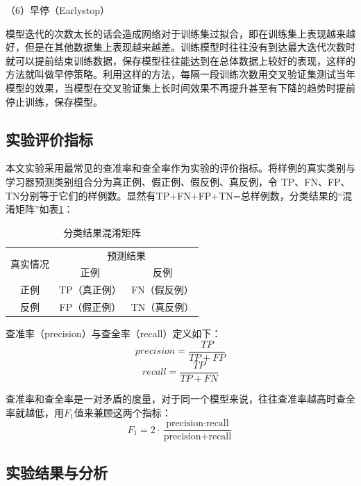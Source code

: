 \documentclass[winfonts,master,oneside,nobackinfo]{njuthesis}
\begin{document}
（6）早停（Earlystop）

模型迭代的次数太长的话会造成网络对于训练集过拟合，即在训练集上表现越来越好，但是在其他数据集上表现越来越差。训练模型时往往没有到达最大迭代次数时就可以提前结束训练数据，保存模型往往能达到在总体数据上较好的表现，这样的方法就叫做早停策略。利用这样的方法，每隔一段训练次数用交叉验证集测试当年模型的效果，当模型在交叉验证集上长时间效果不再提升甚至有下降的趋势时提前停止训练，保存模型。

\subsection{实验评价指标}

本文实验采用最常见的查准率和查全率作为实验的评价指标。将样例的真实类别与学习器预测类别组合分为真正例、假正例、假反例、真反例，令
TP、FN、FP、TN分别等于它们的样例数。显然有TP+FN+FP+TN=总样例数，分类结果的“混淆矩阵”如表\ref{mix-matrix}：

\begin{table}[h]
\centering
\begin{tabular}{|c|c|c|}
\hline
\multirow{2}{*}{真实情况} & \multicolumn{2}{c|}{预测结果} \\ \cline{2-3} 
                      & 正例          & 反例          \\ \hline
正例                    & TP（真正例）     & FN（假反例）     \\ \hline
反例                    & FP（假正例）     & TN（真反例）     \\ \hline
\end{tabular}
\caption{分类结果混淆矩阵}
\label{mix-matrix}
\end{table}

查准率（precision）与查全率（recall）定义如下：
\begin{equation}
precision =\frac{T P}{T P+F P}
\end{equation}
\begin{equation}
recall=\frac{T P}{T P+F N}
\end{equation}

查准率和查全率是一对矛盾的度量，对于同一个模型来说，往往查准率越高时查全率就越低，用$F_{1}$值来兼顾这两个指标：
\begin{equation}
F_{1}=2 \cdot \frac{\text {precision} \cdot \text {recall}}{\text {precision}+\text {recall}}
\end{equation}

\subsection{实验结果与分析}
\end{document}

